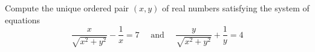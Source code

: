 Compute the unique ordered pair $(x, y)$ of real numbers satisfying the system of equations
$$
\frac{x}{\sqrt{x^{2}+y^{2}}}-\frac{1}{x}=7 \quad \text { and } \quad \frac{y}{\sqrt{x^{2}+y^{2}}}+\frac{1}{y}=4
$$